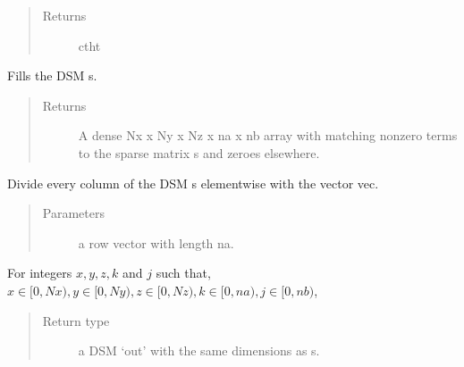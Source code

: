 \documentclass[letterpaper,10pt,english]{sphinxmanual}
\begin{document}
\begin{fulllineitems}
\begin{fulllineitems}
\begin{quote}
\begin{description}
\item[{Returns}] \leavevmode
ctht

\end{description}\end{quote}

\end{fulllineitems}


\begin{fulllineitems}
\label{\detokenize{index:DictionarySparseMatrix.DS.dense}}
Fills the DSM s.
\begin{quote}\begin{description}
\item[{Returns}] \leavevmode
A dense Nx x Ny x Nz x na x nb array with matching nonzero terms to      the sparse matrix s and zeroes elsewhere.

\end{description}\end{quote}

\end{fulllineitems}


\begin{fulllineitems}
\label{\detokenize{index:DictionarySparseMatrix.DS.dict_DSM_divideby_vec}}
Divide every column of the DSM s elementwise with the vector vec.
\begin{quote}\begin{description}
\item[{Parameters}] \leavevmode
{} \textendash{} a row vector with length na.

\end{description}\end{quote}

For integers \(x,y,z,k\) and \(j\) such that,
\(x \in [0,Nx), y \in [0,Ny), z \in [0,Nz), k \in [0,na),j \in [0,nb)\),

\begin{sphinxVerbatim}[commandchars=\\\{\}]
\PYG{p}{[}\PYG{p}{]}\PYG{p}{[}\PYG{p}{]}\PYG{p}{[}\PYG{p}{]}
\end{sphinxVerbatim}
\begin{quote}\begin{description}
\item[{Return type}] \leavevmode
a DSM ‘out’ with the same dimensions as s.


\end{description}
\end{quote}
\end{fulllineitems}
\end{fulllineitems}
\end{document}
